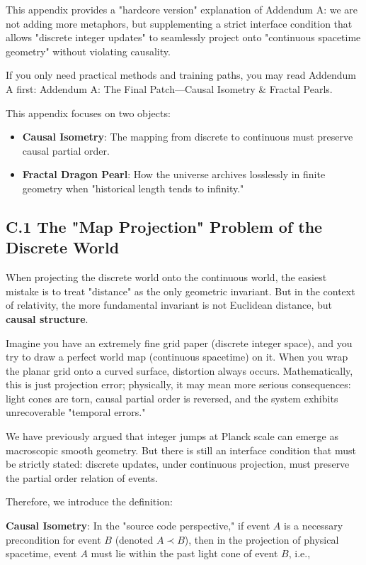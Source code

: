 This appendix provides a "hardcore version" explanation of Addendum A: we are not adding more metaphors, but supplementing a strict interface condition that allows "discrete integer updates" to seamlessly project onto "continuous spacetime geometry" without violating causality.

If you only need practical methods and training paths, you may read Addendum A first: Addendum A: The Final Patch---Causal Isometry \& Fractal Pearls.

This appendix focuses on two objects:

\begin{itemize}
\item \textbf{Causal Isometry}: The mapping from discrete to continuous must preserve causal partial order.
\item \textbf{Fractal Dragon Pearl}: How the universe archives losslessly in finite geometry when "historical length tends to infinity."
\end{itemize}

\subsection*{C.1 The "Map Projection" Problem of the Discrete World}

When projecting the discrete world onto the continuous world, the easiest mistake is to treat "distance" as the only geometric invariant. But in the context of relativity, the more fundamental invariant is not Euclidean distance, but \textbf{causal structure}.

Imagine you have an extremely fine grid paper (discrete integer space), and you try to draw a perfect world map (continuous spacetime) on it. When you wrap the planar grid onto a curved surface, distortion always occurs. Mathematically, this is just projection error; physically, it may mean more serious consequences: light cones are torn, causal partial order is reversed, and the system exhibits unrecoverable "temporal errors."

We have previously argued that integer jumps at Planck scale can emerge as macroscopic smooth geometry. But there is still an interface condition that must be strictly stated: discrete updates, under continuous projection, must preserve the partial order relation of events.

Therefore, we introduce the definition:

\textbf{Causal Isometry}: In the "source code perspective," if event $A$ is a necessary precondition for event $B$ (denoted $A \prec B$), then in the projection of physical spacetime, event $A$ must lie within the past light cone of event $B$, i.e.,

